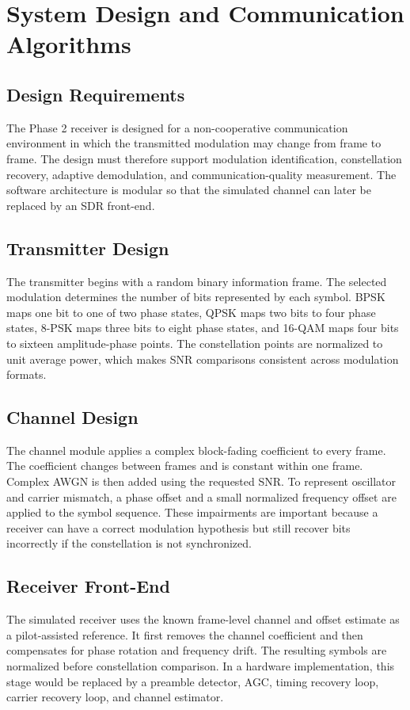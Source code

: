 \chapter{System Design and Communication Algorithms}

\section{Design Requirements}
The Phase 2 receiver is designed for a non-cooperative communication
environment in which the transmitted modulation may change from frame to
frame. The design must therefore support modulation identification,
constellation recovery, adaptive demodulation, and communication-quality
measurement. The software architecture is modular so that the simulated
channel can later be replaced by an SDR front-end.

\section{Transmitter Design}
The transmitter begins with a random binary information frame. The selected
modulation determines the number of bits represented by each symbol. BPSK
maps one bit to one of two phase states, QPSK maps two bits to four phase
states, 8-PSK maps three bits to eight phase states, and 16-QAM maps four
bits to sixteen amplitude-phase points. The constellation points are
normalized to unit average power, which makes SNR comparisons consistent
across modulation formats.

\section{Channel Design}
The channel module applies a complex block-fading coefficient to every frame.
The coefficient changes between frames and is constant within one frame.
Complex AWGN is then added using the requested SNR. To represent oscillator
and carrier mismatch, a phase offset and a small normalized frequency offset
are applied to the symbol sequence. These impairments are important because a
receiver can have a correct modulation hypothesis but still recover bits
incorrectly if the constellation is not synchronized.

\section{Receiver Front-End}
The simulated receiver uses the known frame-level channel and offset estimate
as a pilot-assisted reference. It first removes the channel coefficient and
then compensates for phase rotation and frequency drift. The resulting
symbols are normalized before constellation comparison. In a hardware
implementation, this stage would be replaced by a preamble detector, AGC,
timing recovery loop, carrier recovery loop, and channel estimator.

